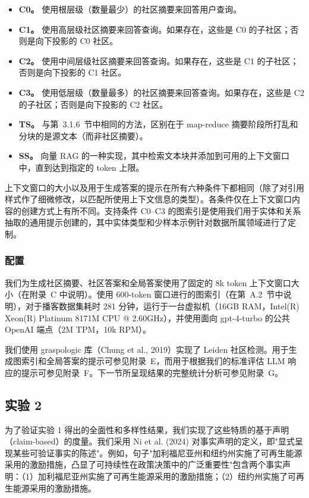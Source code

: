 \documentclass[11pt,UTF8,fontset=fandol]{ctexart}
\begin{document}
\begin{itemize}[leftmargin=2em]
\item \textbf{C0。} 使用根层级（数量最少）的社区摘要来回答用户查询。
\item \textbf{C1。} 使用高层级社区摘要来回答查询。如果存在，这些是 C0 的子社区；否则是向下投影的 C0 社区。
\item \textbf{C2。} 使用中间层级社区摘要来回答查询。如果存在，这些是 C1 的子社区；否则是向下投影的 C1 社区。
\item \textbf{C3。} 使用低层级（数量最多）的社区摘要来回答查询。如果存在，这些是 C2 的子社区；否则是向下投影的 C2 社区。
\item \textbf{TS。} 与第~3.1.6~节中相同的方法，区别在于 map-reduce 摘要阶段所打乱和分块的是源文本（而非社区摘要）。
\item \textbf{SS。} 向量 RAG 的一种实现，其中检索文本块并添加到可用的上下文窗口中，直到达到指定的 token 上限。
\end{itemize}

上下文窗口的大小以及用于生成答案的提示在所有六种条件下都相同（除了对引用样式作了细微修改，以匹配所使用上下文信息的类型）。各条件仅在上下文窗口内容的创建方式上有所不同。支持条件 C0--C3 的图索引是使用我们用于实体和关系抽取的通用提示创建的，其中实体类型和少样本示例针对数据所属领域进行了定制。

\subsubsection{配置}

我们为生成社区摘要、社区答案和全局答案使用了固定的 8k token 上下文窗口大小（在附录~C 中说明）。使用 600-token 窗口进行的图索引（在第~A.2~节中说明），对于播客数据集耗时 281 分钟，运行于一台虚拟机（16GB RAM，Intel(R) Xeon(R) Platinum 8171M CPU @ 2.60GHz），并使用面向 gpt-4-turbo 的公共 OpenAI 端点（2M TPM，10k RPM）。

我们使用 graspologic 库（Chung et al., 2019）实现了 Leiden 社区检测。用于生成图索引和全局答案的提示可参见附录~E，而用于根据我们的标准评估 LLM 响应的提示可参见附录~F。下一节所呈现结果的完整统计分析可参见附录~G。

\subsection{实验 2}

为了验证实验 1 得出的全面性和多样性结果，我们实现了这些特质的基于声明（claim-based）的度量。我们采用 Ni et al. (2024) 对事实声明的定义，即"显式呈现某些可验证事实的陈述"。例如，句子"加利福尼亚州和纽约州实施了可再生能源采用的激励措施，凸显了可持续性在政策决策中的广泛重要性"包含两个事实声明：（1）加利福尼亚州实施了可再生能源采用的激励措施；（2）纽约州实施了可再生能源采用的激励措施。
\end{document}
